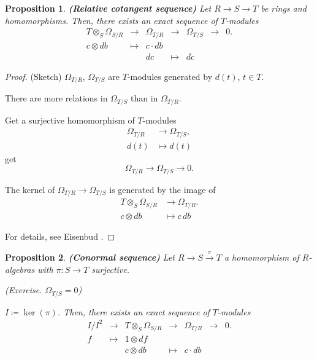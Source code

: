 \documentclass[12pt]{article}
\newtheorem*{proposition}{Proposition}
\theoremstyle{definition}
\begin{document}
\begin{proposition}
\emph{\textbf{(Relative cotangent sequence)}} Let $R\rightarrow S\rightarrow T$ be rings and homomorphisms. Then, there exists an exact sequence of $T$-modules
\[
\begin{array}{rccclcc}
T\otimes_S\Omega_{S/R}&\longrightarrow&\Omega_{T/R}&\longrightarrow&\Omega_{T/S}&\longrightarrow&0.\\
c\otimes db&\longmapsto&c\cdot db\\
&&dc&\longmapsto&dc
\end{array}
\]
\end{proposition}

\begin{proof}
(Sketch) $\Omega_{T/R}$, $\Omega_{T/S}$ are $T$-modules generated by $d(t)$, $t\in T$.

There are more relations in $\Omega_{T/S}$ than in $\Omega_{T/R}$.

Get a surjective homomorphism of $T$-modules
\begin{align*}
\Omega_{T/R}&\longrightarrow\Omega_{T/S},\\
d(t)&\longmapsto d(t)
\end{align*}
get
\[\Omega_{T/R}\longrightarrow\Omega_{T/S}\longrightarrow0.\]

The kernel of $\Omega_{T/R}\rightarrow\Omega_{T/S}$ is generated by the image of
\begin{align*}
T\otimes_S\Omega_{S/R}&\longrightarrow\Omega_{T/R}.\\
c\otimes db&\longmapsto c\,db
\end{align*}

For details, see Eisenbud \cite{eisenbud2013commutative}.
\end{proof}

\begin{proposition}
\emph{\textbf{(Conormal sequence)}} Let $R\rightarrow S\xrightarrow{\pi}T$ a homomorphism of $R$-algebras with $\pi:S\rightarrow T$ surjective.

(Exercise. $\Omega_{T/S}=0$)

$I\coloneqq\ker(\pi)$. Then, there exists an exact sequence of $T$-modules
\[
\begin{array}{rcccrcc}
I/I^2&\longrightarrow&T\otimes_S\Omega_{S/R}&\longrightarrow&\Omega_{T/R}&\longrightarrow&0.\\
f&\longmapsto&1\otimes df\\
&&c\otimes db&\longmapsto&c\cdot db
\end{array}
\]
\end{proposition}
\end{document}
